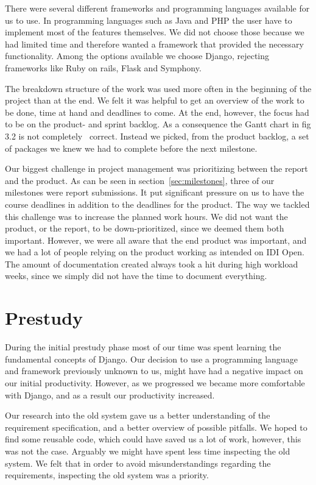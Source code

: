 There were several different frameworks and programming languages
available for us to use. In programming languages such as Java and PHP
the user have to implement most of the features themselves. We did not
choose those because we had limited time and therefore wanted a
framework that provided the necessary functionality. Among the options
available we choose Django, rejecting frameworks like Ruby on rails,
Flask and Symphony. 

The breakdown structure of the work was used more often in the beginning
of the project than at the end. We felt it was helpful to get an
overview of the work to be done, time at hand and deadlines to come. At
the end, however, the focus had to be on the product- and sprint
backlog. As a consequence the Gantt chart in fig 3.2 is not completely
\ correct. Instead we picked, from the product backlog, a set of
packages we knew we had to complete before the next milestone. 

Our biggest challenge in project management was prioritizing between the
report and the product. As can be seen in section~\ref{sec:milestones}, three
of our milestones were report submissions. It put significant pressure
on us to have the course deadlines in addition to the deadlines for the
product. The way we tackled this challenge was to increase the planned
work hours. We did not want the product, or the report, to be
down-prioritized, since we deemed them both important. However, we were
all aware that the end product was important, and we had a lot of
people relying on the product working as intended on IDI Open. The
amount of documentation created always took a hit during high workload
weeks, since we simply did not have the time to document everything.

\section{Prestudy}

During the initial prestudy phase most of our time was spent learning
the fundamental concepts of Django. Our decision to use a programming
language and framework previously unknown to us, might have had a
negative impact on our initial productivity. However, as we progressed
we became more comfortable with Django, and as a result our
productivity increased.

Our research into the old system gave us a better understanding of the
requirement specification, and a better overview of possible pitfalls.
We hoped to find some reusable code, which could have saved us a lot of
work, however, this was not the case. Arguably we might have spent less
time inspecting the old system. We felt that in order to avoid
misunderstandings regarding the requirements, inspecting the old system
was a priority.

